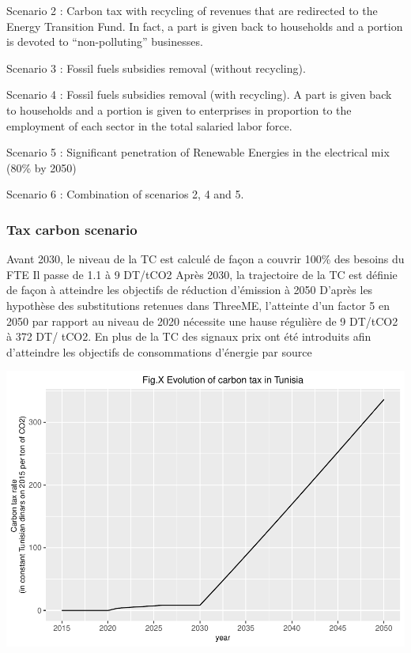 \documentclass[
]{article}
\begin{document}
Scenario 2 : Carbon tax with recycling of revenues that are redirected
to the Energy Transition Fund. In fact, a part is given back to
households and a portion is devoted to ``non-polluting'' businesses.

Scenario 3 : Fossil fuels subsidies removal (without recycling).

Scenario 4 : Fossil fuels subsidies removal (with recycling). A part is
given back to households and a portion is given to enterprises in
proportion to the employment of each sector in the total salaried labor
force.

Scenario 5 : Significant penetration of Renewable Energies in the
electrical mix (80\% by 2050)

Scenario 6 : Combination of scenarios 2, 4 and 5.

\hypertarget{tax-carbon-scenario}{%
\subsubsection{Tax carbon scenario}\label{tax-carbon-scenario}}

Avant 2030, le niveau de la TC est calculé de façon a couvrir 100\% des
besoins du FTE Il passe de 1.1 à 9 DT/tCO2 Après 2030, la trajectoire de
la TC est définie de façon à atteindre les objectifs de réduction
d'émission à 2050 D'après les hypothèse des substitutions retenues dans
ThreeME, l'atteinte d'un factor 5 en 2050 par rapport au niveau de 2020
nécessite une hause régulière de 9 DT/tCO2 à 372 DT/ tCO2. En plus de la
TC des signaux prix ont été introduits afin d'atteindre les objectifs de
consommations d'énergie par source

\includegraphics{Modele-ThreeMe-Tunisie_Sequeira_Valilou_Wang_files/figure-latex/unnamed-chunk-6-1.pdf}
\end{document}
